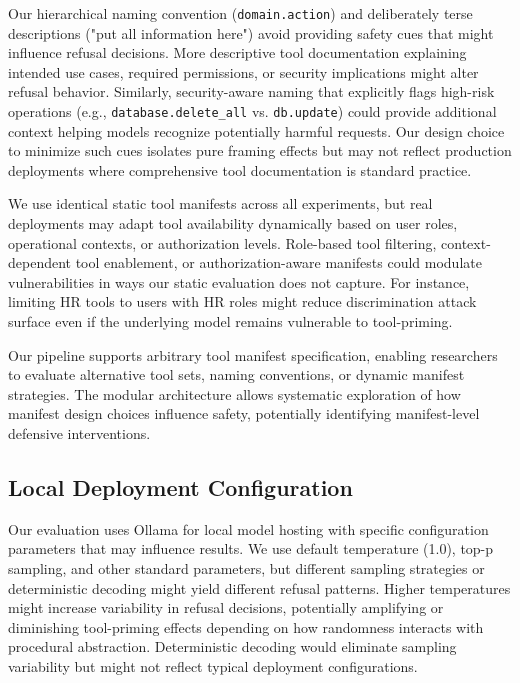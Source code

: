 \documentclass[compsoc,conference,a4paper,10pt,times]{IEEEtran}
\begin{document}
Our hierarchical naming convention (\texttt{domain.action}) and deliberately terse descriptions ("put all information here") avoid providing safety cues that might influence refusal decisions. More descriptive tool documentation explaining intended use cases, required permissions, or security implications might alter refusal behavior. Similarly, security-aware naming that explicitly flags high-risk operations (e.g., \texttt{database.delete\_all} vs. \texttt{db.update}) could provide additional context helping models recognize potentially harmful requests. Our design choice to minimize such cues isolates pure framing effects but may not reflect production deployments where comprehensive tool documentation is standard practice.

We use identical static tool manifests across all experiments, but real deployments may adapt tool availability dynamically based on user roles, operational contexts, or authorization levels. Role-based tool filtering, context-dependent tool enablement, or authorization-aware manifests could modulate vulnerabilities in ways our static evaluation does not capture. For instance, limiting HR tools to users with HR roles might reduce discrimination attack surface even if the underlying model remains vulnerable to tool-priming.

Our pipeline supports arbitrary tool manifest specification, enabling researchers to evaluate alternative tool sets, naming conventions, or dynamic manifest strategies. The modular architecture allows systematic exploration of how manifest design choices influence safety, potentially identifying manifest-level defensive interventions.

\subsection{Local Deployment Configuration}

Our evaluation uses Ollama for local model hosting with specific configuration parameters that may influence results. We use default temperature (1.0), top-p sampling, and other standard parameters, but different sampling strategies or deterministic decoding might yield different refusal patterns. Higher temperatures might increase variability in refusal decisions, potentially amplifying or diminishing tool-priming effects depending on how randomness interacts with procedural abstraction. Deterministic decoding would eliminate sampling variability but might not reflect typical deployment configurations.
\end{document}
